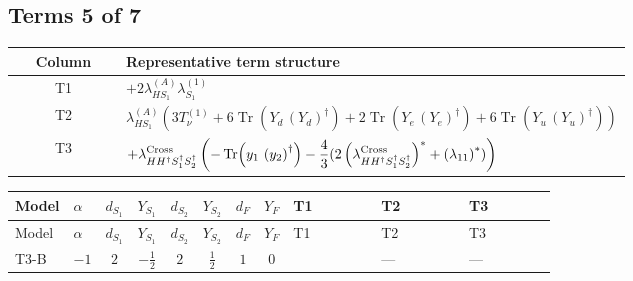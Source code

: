 \documentclass[8pt]{article}
\begin{document}
\begin{landscape}
\subsection*{Terms 5 of 7}
\begin{center}
\begin{tabular}{@{}c >{\raggedright\arraybackslash}p{0.82\linewidth}@{}}
\toprule
Column & Representative term structure \\
\midrule
T1 & \(\displaystyle +2 {\lambda_{HS_1}^{(A)}} {\lambda_{S_1}^{(1)}}\) \\
\midrule
T2 & \(\displaystyle {\lambda_{HS_1}^{(A)}} (3 T_{\nu}^{(1)}+6 \operatorname{Tr}\!\left({Y_d}\,\left({Y_d}\right)^{\dagger}\right)+2 \operatorname{Tr}\!\left({Y_e}\,\left({Y_e}\right)^{\dagger}\right)+6 \operatorname{Tr}\!\left({Y_u}\,\left({Y_u}\right)^{\dagger}\right))\) \\
\midrule
T3 & \(\displaystyle +{\lambda_{H H^\dagger S_1^\dagger S_2^\dagger}^{\rm Cross}} \left(-\operatorname{Tr}\!\left({y_1}\,\left({y_2}\right)^{\dagger}\right)-\frac{4}{3} (2 \left({\lambda_{H H^\dagger S_1^\dagger S_2^\dagger}^{\rm Cross}}\right)^{*}+\left({\lambda_{11}}\right)^{*})\right)\) \\
\midrule
\bottomrule
\end{tabular}
\end{center}
\smallskip
\tiny
\begin{longtable}{@{}llcccccc >{\raggedright\arraybackslash}p{0.21\linewidth} >{\raggedright\arraybackslash}p{0.21\linewidth} >{\raggedright\arraybackslash}p{0.21\linewidth}@{}}
\toprule
Model & $\alpha$ & $d_{S_1}$ & $Y_{S_1}$ & $d_{S_2}$ & $Y_{S_2}$ & $d_F$ & $Y_F$ & T1 & T2 & T3 \\
\midrule
\endfirsthead
\toprule
Model & $\alpha$ & $d_{S_1}$ & $Y_{S_1}$ & $d_{S_2}$ & $Y_{S_2}$ & $d_F$ & $Y_F$ & T1 & T2 & T3 \\
\midrule
\endhead
T3-B & $-1$ & $2$ & $-\frac{1}{2}$ & $2$ & $\frac{1}{2}$ & $1$ & $0$ & \scriptsize\adjustbox{max width=\linewidth}{$\begin{gathered} +2 {\lambda_{HS_1}^{(A)}} {\lambda_{S_1}^{(1)}}\end{gathered}$} & --- & --- \\
\midrule

\end{longtable}
\end{landscape}
\end{document}
